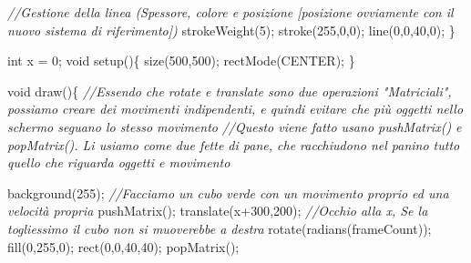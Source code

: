 \documentclass[
]{article}
\newenvironment{Shaded}{}{}
\newcommand{\CommentTok}[1]{\textcolor[rgb]{0.38,0.63,0.69}{\textit{#1}}}
\newcommand{\DataTypeTok}[1]{\textcolor[rgb]{0.56,0.13,0.00}{#1}}
\newcommand{\DecValTok}[1]{\textcolor[rgb]{0.25,0.63,0.44}{#1}}
\newcommand{\FunctionTok}[1]{\textcolor[rgb]{0.02,0.16,0.49}{#1}}
\newcommand{\NormalTok}[1]{#1}
\newcommand{\OperatorTok}[1]{\textcolor[rgb]{0.40,0.40,0.40}{#1}}
\begin{document}
\begin{Shaded}
\begin{Highlighting}[]
    \CommentTok{//Gestione della linea (Spessore, colore e posizione [posizione ovviamente con il nuovo sistema di riferimento])}
    \FunctionTok{strokeWeight}\OperatorTok{(}\DecValTok{5}\OperatorTok{);}
    \FunctionTok{stroke}\OperatorTok{(}\DecValTok{255}\OperatorTok{,}\DecValTok{0}\OperatorTok{,}\DecValTok{0}\OperatorTok{);}
    \FunctionTok{line}\OperatorTok{(}\DecValTok{0}\OperatorTok{,}\DecValTok{0}\OperatorTok{,}\DecValTok{40}\OperatorTok{,}\DecValTok{0}\OperatorTok{);}
\OperatorTok{\}}
\end{Highlighting}
\end{Shaded}

\begin{Shaded}
\begin{Highlighting}[]
\DataTypeTok{int}\NormalTok{ x }\OperatorTok{=} \DecValTok{0}\OperatorTok{;}
\DataTypeTok{void} \FunctionTok{setup}\OperatorTok{()\{}
    \FunctionTok{size}\OperatorTok{(}\DecValTok{500}\OperatorTok{,}\DecValTok{500}\OperatorTok{);}
    \FunctionTok{rectMode}\OperatorTok{(}\NormalTok{CENTER}\OperatorTok{);}
\OperatorTok{\}}

\DataTypeTok{void} \FunctionTok{draw}\OperatorTok{()\{}
\CommentTok{//Essendo che rotate e translate sono due operazioni "Matriciali", possiamo creare dei movimenti indipendenti, e quindi evitare che più oggetti nello schermo seguano lo stesso movimento}
\CommentTok{//Questo viene fatto usano pushMatrix() e popMatrix(). Li usiamo come due fette di pane, che racchiudono nel panino tutto quello che riguarda oggetti e movimento}

\FunctionTok{background}\OperatorTok{(}\DecValTok{255}\OperatorTok{);}
\CommentTok{//Facciamo un cubo verde con un movimento proprio ed una velocità propria}
    \FunctionTok{pushMatrix}\OperatorTok{();}
    \FunctionTok{translate}\OperatorTok{(}\NormalTok{x}\OperatorTok{+}\DecValTok{300}\OperatorTok{,}\DecValTok{200}\OperatorTok{);} \CommentTok{//Occhio alla x, Se la togliessimo il cubo non si muoverebbe a destra}
    \FunctionTok{rotate}\OperatorTok{(}\FunctionTok{radians}\OperatorTok{(}\NormalTok{frameCount}\OperatorTok{));}
    \FunctionTok{fill}\OperatorTok{(}\DecValTok{0}\OperatorTok{,}\DecValTok{255}\OperatorTok{,}\DecValTok{0}\OperatorTok{);}
    \FunctionTok{rect}\OperatorTok{(}\DecValTok{0}\OperatorTok{,}\DecValTok{0}\OperatorTok{,}\DecValTok{40}\OperatorTok{,}\DecValTok{40}\OperatorTok{);}
    \FunctionTok{popMatrix}\OperatorTok{();}


\end{Highlighting}
\end{Shaded}
\end{document}
